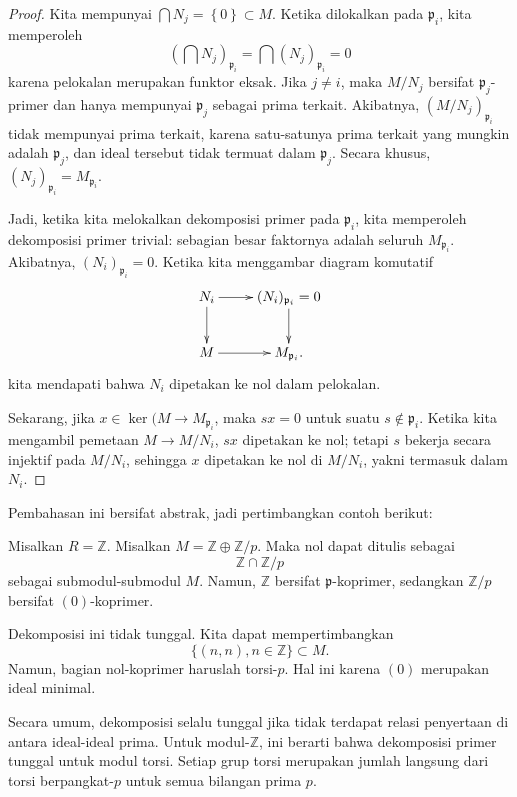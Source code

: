 \begin{proof} 
Kita mempunyai $\bigcap N_j = \left\{0\right\} \subset M$. Ketika dilokalkan pada
$\mathfrak{p}_i$, kita memperoleh
\[ (\bigcap N_j)_{\mathfrak{p}_i} = \bigcap (N_j)_{\mathfrak{p}_i} =0 \]
karena pelokalan merupakan funktor eksak. Jika $j \neq i$, maka $M/N_j$ bersifat
$\mathfrak{p}_j$-primer dan hanya mempunyai $\mathfrak{p}_j$ sebagai prima terkait.
Akibatnya, $(M/N_j)_{\mathfrak{p}_i}$ tidak mempunyai prima terkait, karena satu-satunya
prima terkait yang mungkin adalah $\mathfrak{p}_j$, dan ideal tersebut tidak termuat dalam
$\mathfrak{p}_j$.
Secara khusus, $(N_j)_{\mathfrak{p}_i} = M_{\mathfrak{p}_i}$.

Jadi, ketika kita melokalkan dekomposisi primer pada $\mathfrak{p}_i$, kita memperoleh
dekomposisi primer trivial: sebagian besar faktornya adalah seluruh
$M_{\mathfrak{p}_i}$. Akibatnya, $(N_i)_{\mathfrak{p}_i}=0$. Ketika kita menggambar
diagram komutatif
\[ 
\xymatrix{
N_i \ar[r] \ar[d]  &  (N_i)_{\mathfrak{p}_i} = 0 \ar[d]  \\
M \ar[r] &  M_{\mathfrak{p}_i}.
}
\]
kita mendapati bahwa $N_i$ dipetakan ke nol dalam pelokalan.

Sekarang, jika $x \in \ker(M \to M_{\mathfrak{p}_i}$, maka $sx = 0$ untuk suatu $s \notin
\mathfrak{p}_i$. Ketika kita mengambil pemetaan $M \to M/N_i$, $sx$ dipetakan ke nol; tetapi $s$
bekerja secara injektif pada $M/N_i$, sehingga $x$ dipetakan ke nol di $M/N_i$, yakni termasuk dalam
$N_i$.
\end{proof} 

Pembahasan ini bersifat abstrak, jadi pertimbangkan contoh berikut:
\begin{example} Misalkan $ R = \mathbb{Z}$.
Misalkan $M = \mathbb{Z} \oplus \mathbb{Z}/p$. Maka nol dapat ditulis sebagai 
\[ \mathbb{Z} \cap \mathbb{Z}/p  \]
sebagai submodul-submodul $M$. Namun, $\mathbb{Z}$ bersifat $\mathfrak{p}$-koprimer, sedangkan
$\mathbb{Z}/p$ bersifat $(0)$-koprimer. 

Dekomposisi ini tidak tunggal. Kita dapat mempertimbangkan 
\[ \{(n,n), n \in \mathbb{Z}\} \subset M.  \]
Namun, bagian nol-koprimer haruslah torsi-$p$. Hal ini karena
$(0)$ merupakan ideal minimal. 

Secara umum, dekomposisi selalu tunggal jika
tidak terdapat relasi penyertaan di antara ideal-ideal prima. Untuk modul-$\mathbb{Z}$, ini
berarti bahwa dekomposisi primer tunggal untuk modul torsi. 
Setiap grup torsi merupakan jumlah langsung dari torsi berpangkat-$p$ untuk semua bilangan prima $p$. 
\end{example} 


